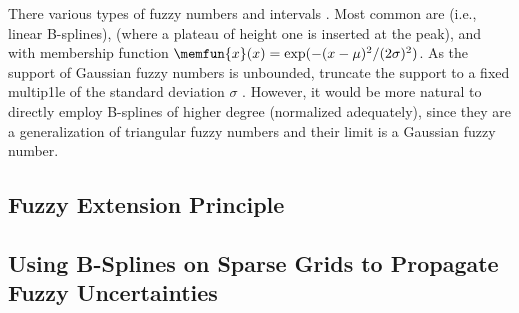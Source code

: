 There various types of fuzzy numbers and intervals \cite{Klimke06Uncertainty}.
Most common are
 (i.e., linear B-splines),
(where a plateau of height one is inserted at the peak), and
 with membership function
$\memfun{x}(x) = \exp(-(x - \mu)^2/(2\sigma)^2)$.
As the support of Gaussian fuzzy numbers is unbounded,
 truncate the support
to a fixed multip1le of the standard deviation $\sigma$
\cite{Klimke06Uncertainty}.
However, it would be more natural to directly employ B-splines of
higher degree (normalized adequately), since they are a generalization
of triangular fuzzy numbers and their limit is a Gaussian fuzzy number.



\subsection{Fuzzy Extension Principle}
\label{sec:542fuzzyExtensionPrinciple}

\blindtext{}



\subsection{Using B-Splines on Sparse Grids to Propagate Fuzzy Uncertainties}
\label{sec:543fuzzyBSplines}

\blindtext{}
